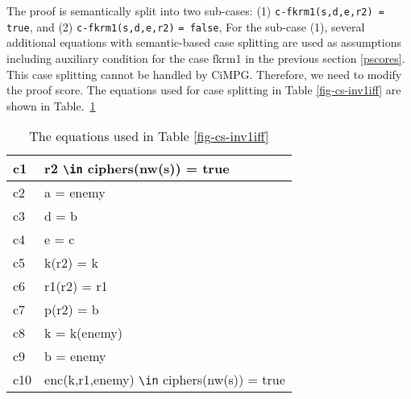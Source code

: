 \documentclass[a4paper,fleqn]{cas-dc}
\begin{document}
The proof is semantically split into two sub-cases: (1)  \verb!c-fkrm1(s,d,e,r2) = true!,
and (2) \verb!c-fkrm1(s,d,e,r2)! \verb!= false!,
For the sub-case (1), several additional equations with semantic-based case splitting are used as assumptions including auxiliary condition for the case fkrm1 in the previous section \ref{pscores}. This case splitting cannot be handled by CiMPG. Therefore, we need to modify the proof score. The equations used for case splitting in Table \ref{fig-cs-inv1iff} are shown in Table.~\ref{fig-inv1iff}
\noindent
\begin{table}[]
	\begin{tabular}{l|l}
		\hline
		c1           &  r2 \verb!\in! ciphers(nw(s)) = true                                               \\ \hline
		c2         &   a = enemy                                                    \\ \hline
		c3         &    d = b                                                   \\ \hline
		c4 & e = c
		\\ \hline
		c5 & k(r2) = k
		\\ \hline
		c6   & r1(r2) = r1
		\\ \hline
		c7     & p(r2) = b
		\\ \hline
		c8       &   k = k(enemy)                                
		\\ \hline
		c9      & b = enemy
		
	\\ \hline
		
	    c10 &  enc(k,r1,enemy) \verb!\in! ciphers(nw(s)) = true
	    \\ \hline
	\end{tabular}
\caption{The equations used in Table \ref{fig-cs-inv1iff}}
\label{fig-inv1iff}
\end{table}
\end{document}

